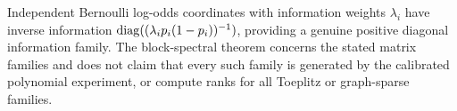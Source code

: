 Independent Bernoulli log-odds coordinates with information weights $\lambda_i$ have inverse information $\operatorname{diag}((\lambda_ip_i(1-p_i))^{-1})$, providing a genuine positive diagonal information family. The block-spectral theorem concerns the stated matrix families and does not claim that every such family is generated by the calibrated polynomial experiment, or compute ranks for all Toeplitz or graph-sparse families.
